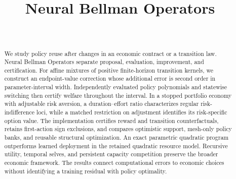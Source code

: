\documentclass[ecta]{econsocart}
\begin{document}
\begin{frontmatter}
\title{Neural Bellman Operators}
\begin{aug}
\author[id=au1,addressref={add1}]{~}
\address[id=add1]{,}
\end{aug}
\begin{abstract}
We study policy reuse after changes in an economic contract or a transition law. Neural Bellman Operators separate proposal, evaluation, improvement, and certification. For affine mixtures of positive finite-horizon transition kernels, we construct an endpoint-value correction whose additional error is second order in parameter-interval width. Independently evaluated policy polynomials and statewise switching then certify welfare throughout the interval. In a stopped portfolio economy with adjustable risk aversion, a duration--effort ratio characterizes regular risk-indifference loci, while a matched restriction on adjustment identifies its risk-specific option value. The implementation certifies reward and transition counterfactuals, retains first-action sign exclusions, and compares optimistic support, mesh-only policy banks, and reusable structural optimization. An exact parametric quadratic program outperforms learned deployment in the retained quadratic resource model. Recursive utility, temporal selves, and persistent capacity competition preserve the broader economic framework. The results connect computational errors to economic choices without identifying a training residual with policy optimality.
\end{abstract}
\begin{keyword}
\end{keyword}
\end{frontmatter}












\end{document}
